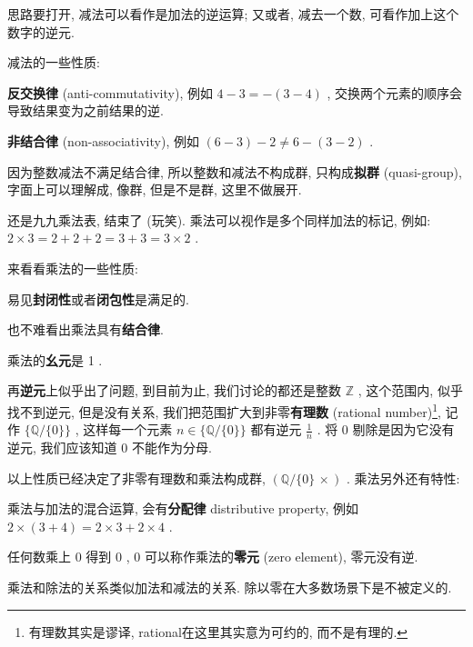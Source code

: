 \begin{tcolorbox}[size=fbox, breakable, enhanced jigsaw, title={减法 (subtraction)}]

思路要打开, 减法可以看作是加法的逆运算; 又或者, 减去一个数,
可看作加上这个数字的逆元.

减法的一些性质:

\begin{itemize}
{\item
  \textbf{反交换律} (anti-commutativity), 例如 $4−3=−(3−4)$ ,
  交换两个元素的顺序会导致结果变为之前结果的逆.}
{\item
  \textbf{非结合律} (non-associativity), 例如 $(6−3)−2\neq 6−(3−2)$ .}
\end{itemize}

因为整数减法不满足结合律, 所以整数和减法不构成群, 只构成\textbf{拟群}
(quasi-group), 字面上可以理解成, 像群, 但是不是群, 这里不做展开.

\end{tcolorbox}

\begin{tcolorbox}[size=fbox, breakable, enhanced jigsaw, title={乘法(multiplication)}]

还是九九乘法表, 结束了 (玩笑). 乘法可以视作是多个同样加法的标记, 例如:
$2×3=2+2+2=3+3=3×2$ .

来看看乘法的一些性质:

\begin{itemize}
{\item
  易见\textbf{封闭性}或者\textbf{闭包性}是满足的.}
{\item
  也不难看出乘法具有\textbf{结合律}.}
{\item
  乘法的\textbf{幺元}是 1 .}
{\item
  再\textbf{逆元}上似乎出了问题, 到目前为止, 我们讨论的都还是整数
  $\mathbb{Z}$ , 这个范围内, 似乎找不到逆元, 但是没有关系,
  我们把范围扩大到非零\textbf{有理数} (rational number)\footnote{有理数其实是谬译,
    rational在这里其实意为可约的, 而不是有理的.}, 记作
  $\{\mathbb{Q}/\{0\}\}$ , 这样每一个元素 $n\in\{\mathbb{Q}/\{0\}\}$
  都有逆元 $\frac{1}{n}$ . 将 $0$ 剔除是因为它没有逆元, 我们应该知道
  0 不能作为分母.}
\end{itemize}

以上性质已经决定了非零有理数和乘法构成群, $(\mathbb{Q}/\{0\}\,×)$ .
乘法另外还有特性:

\begin{itemize}
{\item
  乘法与加法的混合运算, 会有\textbf{分配律} distributive property, 例如
  $2×(3+4)=2×3+2×4$ .}
{\item
  任何数乘上 $0$ 得到 $0$ , $0$ 可以称作乘法的\textbf{零元} (zero
  element), 零元没有逆.}
\end{itemize}

\end{tcolorbox}

\begin{tcolorbox}[size=fbox, breakable, enhanced jigsaw, title={除法 (division)}]

乘法和除法的关系类似加法和减法的关系. 除以零在大多数场景下是不被定义的.

\end{tcolorbox}